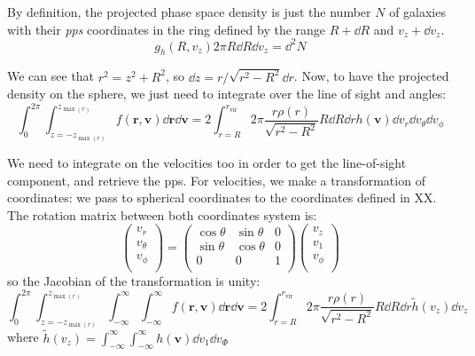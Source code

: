 By definition, the projected phase space density is just the number $N$ of
galaxies with their \emph{pps} coordinates in the ring defined by the range
$R+\dd R$ and $v_z+\dd v_z$.
%
\begin{equation}
    g_h \left(R, v_z\right)2\pi R \dd R \dd v_z = \dd^2 N
\end{equation}

We can see that $r^2=z^2+R^2$, so $\dd{z}=r/\sqrt{r^2-R^2}\dd{r}$.
Now, to have the projected density on the sphere, we just need to integrate
over the line of sight and angles:
%
\begin{equation}
    \label{eq:intfunc}
    \int_0^{2\pi}\int_{z=-z_{\max\left(r\right)}}^{z_{\max\left(r\right)}}
    f\left(\textbf{r},\textbf{v}\right)\dd\textbf{r}
    \dd{\textbf{v}}=2\int_{r=R}^{r_{\mathrm{vir}}}2\pi
    \frac{r\rho\left({r}\right)}{\sqrt{r^2-R^2}}{R}\dd{R}\dd{r}
    {h\left({\textbf{v}}\right)}\dd{v_r}\dd{v_\theta}\dd{v_\phi}
\end{equation}

We need to integrate on the velocities too in order to get the line-of-sight
component, and retrieve the pps. For velocities, we make a transformation of
coordinates: we pass to spherical coordinates to the coordinates defined in
XX\@. The rotation matrix between both coordinates system is:
\begin{equation}
    \begin{pmatrix}
        v_r \\
        v_\theta \\
        v_\phi \\
    \end{pmatrix}
    =
    \begin{pmatrix}
        \cos\theta & \sin\theta & 0 \\
        \sin\theta & \cos\theta & 0 \\
        0 & 0 & 1 \\
    \end{pmatrix}
    \begin{pmatrix}
        v_z \\
        v_1 \\
        v_\phi \\
    \end{pmatrix}
\end{equation}
%
so the Jacobian of the transformation is unity:
%
\begin{equation}
    \label{eq:intintfunc}
    \int_0^{2\pi}\int_{z=-z_{\max\left(r\right)}}^{z_{\max\left(r\right)}}
    \int_{-\infty}^\infty\int_{-\infty}^\infty
    f\left(\textbf{r},\textbf{v}\right)\dd\textbf{r}\dd\textbf{v}=
    2\int_{r=R}^{r_{\mathrm{vir}}}2\pi
    \frac{r\rho\left(r\right)}{\sqrt{r^2-R^2}}R\dd{R}\dd{r}
    \tilde{h}\left(v_z\right)\dd{v_z}
\end{equation}
%
where $\tilde{h} \left(v_z\right) = \int_{-\infty}^\infty\int_{-\infty}^\infty
h \left(\textbf{v}\right)\dd v_1 \dd v_\Phi$

